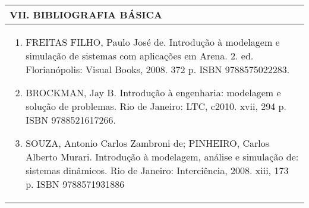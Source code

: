 \documentclass[12pt]{article}
\begin{document}
\begin{longtable}{|L{1.025\textwidth}|} \hline
%
{\bf VII. BIBLIOGRAFIA BÁSICA} \\ \hline
\begin{enumerate}
%
\item FREITAS FILHO, Paulo José de. Introdução à modelagem e simulação de sistemas com aplicações em Arena. 2. ed. Florianópolis: Visual Books, 2008. 372 p. ISBN 9788575022283.
\item BROCKMAN, Jay B. Introdução à engenharia: modelagem e solução de problemas. Rio de Janeiro: LTC, c2010. xvii, 294 p. ISBN 9788521617266.
\item SOUZA, Antonio Carlos Zambroni de; PINHEIRO, Carlos Alberto Murari. Introdução à modelagem, análise e simulação de: sistemas dinâmicos. Rio de Janeiro: Interciência, 2008. xiii, 173 p. ISBN 9788571931886

\end{enumerate}
 \\ \hline
\end{longtable}


\newpage
\end{document}

